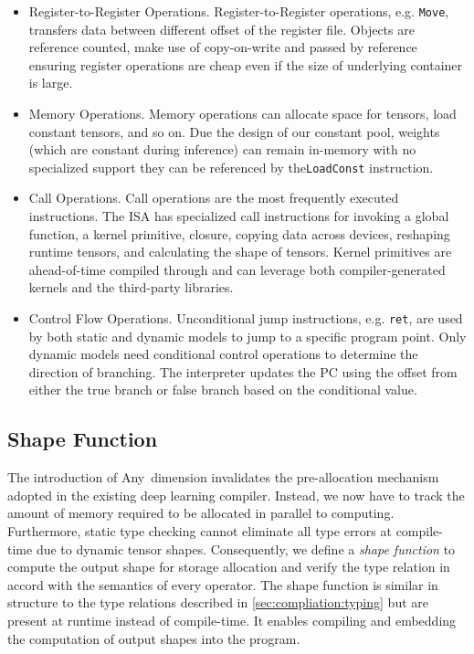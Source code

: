 \begin{itemize}
    \item Register-to-Register Operations. Register-to-Register operations, e.g. \texttt{Move}, transfers data between different offset of the register file. Objects are reference counted, make use of copy-on-write and passed by reference ensuring register operations are cheap even if the size of underlying container is large.
    \item Memory Operations. Memory operations can allocate space for tensors, load constant tensors, and so on. Due the design of our constant pool, weights (which are constant during inference) can remain in-memory with no specialized support they can be referenced by the\texttt{LoadConst} instruction.
    \item Call Operations. Call operations are the most frequently executed instructions. The ISA
    has specialized call instructions for invoking a global function, a kernel primitive, closure, copying data across devices, reshaping runtime tensors, and calculating the shape of tensors. Kernel primitives are ahead-of-time compiled through and can leverage both compiler-generated kernels and the third-party libraries.
    \item Control Flow Operations. Unconditional jump instructions, e.g. \texttt{ret}, are used by both static and dynamic models to jump to a specific program point. Only dynamic models need conditional control operations to determine the direction of branching. The interpreter updates the PC using the offset from either the true branch or false branch based on the conditional value.
\end{itemize}

\subsection{Shape Function}
\label{sec:compilation:shape-func}

The introduction of Any~dimension invalidates the pre-allocation mechanism adopted in the existing deep learning compiler.
Instead, we now have to track the amount of memory required to be allocated in parallel to computing.
Furthermore, static type checking cannot eliminate all type errors at compile-time due to dynamic tensor shapes.
Consequently, we define a {\em shape function} to compute the output shape for storage allocation and verify the type relation in accord with the semantics of every operator.
The shape function is similar in structure to the type relations described in \autoref{sec:compliation:typing} but are present at runtime instead of compile-time.
It enables compiling and embedding the computation of output shapes into the program.

